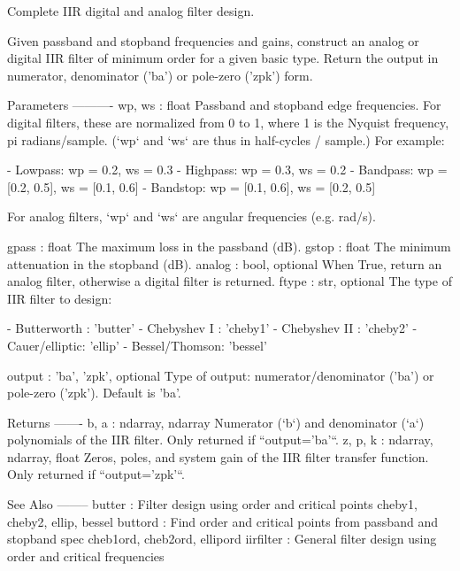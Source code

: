 \begin{DoxyVerb}Complete IIR digital and analog filter design.

Given passband and stopband frequencies and gains, construct an analog or
digital IIR filter of minimum order for a given basic type.  Return the
output in numerator, denominator ('ba') or pole-zero ('zpk') form.

Parameters
----------
wp, ws : float
    Passband and stopband edge frequencies.
    For digital filters, these are normalized from 0 to 1, where 1 is the
    Nyquist frequency, pi radians/sample.  (`wp` and `ws` are thus in
    half-cycles / sample.)  For example:

        - Lowpass:   wp = 0.2,          ws = 0.3
        - Highpass:  wp = 0.3,          ws = 0.2
        - Bandpass:  wp = [0.2, 0.5],   ws = [0.1, 0.6]
        - Bandstop:  wp = [0.1, 0.6],   ws = [0.2, 0.5]

    For analog filters, `wp` and `ws` are angular frequencies (e.g. rad/s).

gpass : float
    The maximum loss in the passband (dB).
gstop : float
    The minimum attenuation in the stopband (dB).
analog : bool, optional
    When True, return an analog filter, otherwise a digital filter is
    returned.
ftype : str, optional
    The type of IIR filter to design:

        - Butterworth   : 'butter'
        - Chebyshev I   : 'cheby1'
        - Chebyshev II  : 'cheby2'
        - Cauer/elliptic: 'ellip'
        - Bessel/Thomson: 'bessel'

output : {'ba', 'zpk'}, optional
    Type of output:  numerator/denominator ('ba') or pole-zero ('zpk').
    Default is 'ba'.

Returns
-------
b, a : ndarray, ndarray
    Numerator (`b`) and denominator (`a`) polynomials of the IIR filter.
    Only returned if ``output='ba'``.
z, p, k : ndarray, ndarray, float
    Zeros, poles, and system gain of the IIR filter transfer
    function.  Only returned if ``output='zpk'``.

See Also
--------
butter : Filter design using order and critical points
cheby1, cheby2, ellip, bessel
buttord : Find order and critical points from passband and stopband spec
cheb1ord, cheb2ord, ellipord
iirfilter : General filter design using order and critical frequencies\end{DoxyVerb}
 \hypertarget{namespacescipy_1_1signal_1_1filter__design_a008214925846b0a984096fb298eef2df}{}
